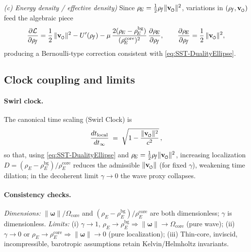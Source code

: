 \documentclass[reprint,aps,onecolumn,nofootinbib]{revtex4-2}
\newcommand{\swirlarrow}{%
    \mathchoice{\mkern-2mu\scriptstyle\boldsymbol{\circlearrowleft}}%
    {\mkern-2mu\scriptstyle\boldsymbol{\circlearrowleft}}%
    {\mkern-2mu\scriptscriptstyle\boldsymbol{\circlearrowleft}}%
    {\mkern-2mu\scriptscriptstyle\boldsymbol{\circlearrowleft}}%
}
\newcommand{\vswirl}{\mathbf{v}_{\swirlarrow}}
\newcommand{\vnorm}{\lVert \vswirl \rVert}               %
\newcommand{\rhoE}{\rho_{\!E}}                           %
\newcommand{\omegaVec}{\boldsymbol{\omega}}
\newcommand{\rhoF}{\rho_{\!f}}     %
\newcommand{\OmegaCore}{\Omega_{\mathrm{core}}}
\newcommand{\bg}{\mathrm{bg}}
\newcommand{\core}{\mathrm{core}}
\begin{document}
        \noindent\emph{(c) Energy density / effective density)}
        Since $\rhoE=\tfrac12\rhoF\vnorm^2$, variations in $(\rhoF,\vswirl)$ feed the algebraic piece
        \begin{equation}
        \frac{\partial \mathcal L}{\partial \rhoF}
        = \frac12\,\vnorm^2 - U'(\rhoF)
        - \mu\,\frac{2(\rhoE-\rhoE^{\bg})}{(\rhoE^{\core})^{2}}\,\frac{\partial \rhoE}{\partial \rhoF},
        \qquad
        \frac{\partial \rhoE}{\partial \rhoF}=\frac12\,\vnorm^2,
        \end{equation}
        producing a Bernoulli-type correction consistent with \eqref{eq:SST-DualityEllipse}.

    \subsection{Clock coupling and limits}
    \label{subsec:Clock-Limits}

    \paragraph{Swirl clock.}
        The canonical time scaling (Swirl Clock) is
        \begin{equation}
        \frac{dt_{\text{local}}}{dt_{\infty}}
        \;=\;\sqrt{1-\frac{\vnorm^{2}}{c^{2}}}\,,
        \end{equation}
        so that, using \eqref{eq:SST-DualityEllipse} and $\rhoE=\tfrac12\rhoF\vnorm^2$,
        increasing localization $D=(\rhoE-\rhoE^{\bg})/\rhoE^{\core}$ reduces the admissible $\vnorm$
        (for fixed $\gamma$), weakening time dilation; in the decoherent limit $\gamma\to0$ the wave proxy collapses.

    \paragraph{Consistency checks.}
        \emph{Dimensions:} $\lVert\omegaVec\rVert/\OmegaCore$ and $(\rhoE-\rhoE^{\bg})/\rhoE^{\core}$ are both dimensionless; $\gamma$ is dimensionless.
        \emph{Limits:}
        (i) $\gamma\to1$, $\rhoE\to\rhoE^{\bg}\Rightarrow \lVert\omegaVec\rVert\to\OmegaCore$ (pure wave);
        (ii) $\gamma\to0$ or $\rhoE\!\to\!\rhoE^{\core}\Rightarrow \lVert\omegaVec\rVert\to0$ (pure localization);
        (iii) Thin-core, inviscid, incompressible, barotropic assumptions retain Kelvin/Helmholtz invariants.

\end{document}
